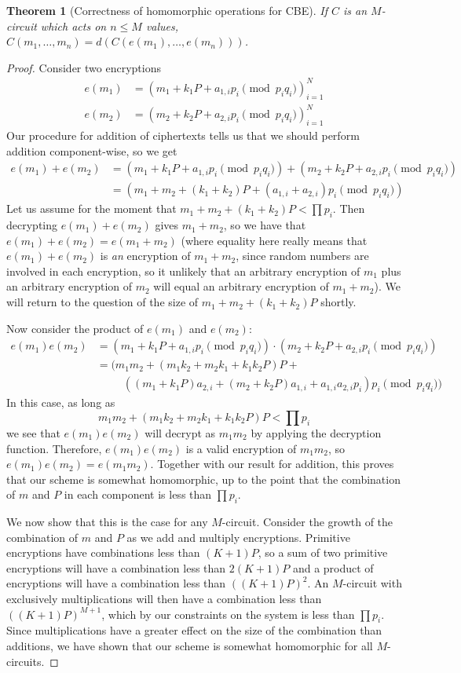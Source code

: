 \documentclass[11pt]{report}
\newtheorem{thm}{Theorem}
\begin{document}
\begin{thm}[Correctness of homomorphic operations for CBE]
If $C$ is an $M$-circuit which acts on $n\leq M$ values, $C(m_1,\dots,m_n) = d(C(e(m_1),\dots,e(m_n)))$.
\end{thm}

\begin{proof}
Consider two encryptions
\begin{align*}
e(m_1) &= (m_1+ k_1P+a_{1,i}p_i \pmod{p_iq_i})_{i=1}^N\\
e(m_2) &= (m_2+ k_2P+a_{2,i}p_i \pmod{p_iq_i})_{i=1}^N
\end{align*}
Our procedure for addition of ciphertexts tells us that we should perform addition component-wise, so we get
\begin{align*}
e(m_1)+e(m_2) &= (m_1+k_1P+a_{1,i}p_i \pmod{p_iq_i}) + (m_2+ k_2P+a_{2,i}p_i \pmod{p_iq_i}) \\
\ &= (m_1+m_2+ (k_1+k_2)P+(a_{1,i}+a_{2,i})p_i \pmod{p_iq_i})
\end{align*}
Let us assume for the moment that $m_1+m_2+(k_1+k_2)P < \prod p_i$. Then decrypting $e(m_1)+e(m_2)$ gives $m_1+m_2$, so we have that $e(m_1)+e(m_2) = e(m_1+m_2)$ (where equality here really means that $e(m_1)+e(m_2)$ is \emph{an} encryption of $m_1+m_2$, since random numbers are involved in each encryption, so it unlikely that an arbitrary encryption of $m_1$ plus an arbitrary encryption of $m_2$ will equal an arbitrary encryption of $m_1+m_2$). We will return to the question of the size of $m_1+m_2+(k_1+k_2)P$ shortly.

Now consider the product of $e(m_1)$ and $e(m_2)$:
\begin{align*}
e(m_1) e(m_2) &= (m_1+ k_1P+a_{1,i}p_i \pmod{p_iq_i}) \cdot (m_2+ k_2P+a_{2,i}p_i \pmod{p_iq_i}) \\
\ &= (m_1m_2+ (m_1k_2+m_2k_1+k_1k_2P)P+\\
& \ \ \ \ \ \ \ \ \ \ \ ((m_1+k_1P)a_{2,i}+(m_2+k_2P)a_{1,i}+a_{1,i}a_{2,i}p_i)p_i \pmod{p_iq_i})
\end{align*}
In this case, as long as
\[m_1m_2+ (m_1k_2+m_2k_1+k_1k_2P)P < \prod p_i\]
we see that $e(m_1)e(m_2)$ will decrypt as $m_1m_2$ by applying the decryption function. Therefore, $e(m_1)e(m_2)$ is a valid encryption of $m_1m_2$, so $e(m_1)e(m_2) = e(m_1m_2)$. Together with our result for addition, this proves that our scheme is somewhat homomorphic, up to the point that the combination of $m$ and $P$ in each component is less than $\prod p_i$.

We now show that this is the case for any $M$-circuit. Consider the growth of the combination of $m$ and $P$ as we add and multiply encryptions. Primitive encryptions have combinations less than $(K+1)P$, so a sum of two primitive encryptions will have a combination less than $2(K+1)P$ and a product of encryptions will have a combination less than $((K+1)P)^2$. An $M$-circuit with exclusively multiplications will then have a combination less than $((K+1)P)^{M+1}$, which by our constraints on the system is less than $\prod p_i$. Since multiplications have a greater effect on the size of the combination than additions, we have shown that our scheme is somewhat homomorphic for all $M$-circuits.


\end{proof}
\end{document}
